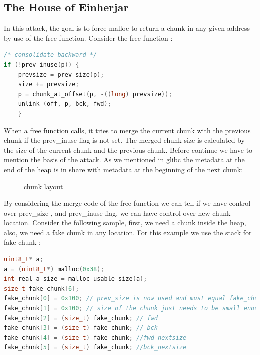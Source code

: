 \documentclass{masterthesis}
\newcommand*\libc{glibc}
\newcommand*\sbs{small bins}
\begin{document}
\subsection{The House of Einherjar}
In this attack, the goal is to force malloc to return a chunk in any given address by use of the free function. Consider the free function :

\begin{lstlisting}[language=c,frame=tlrb]
/* consolidate backward */
if (!prev_inuse(p)) {
    prevsize = prev_size(p);
    size += prevsize;
    p = chunk_at_offset(p, -((long) prevsize));
	unlink (off, p, bck, fwd);
	} 
 \end{lstlisting}
When a free function calls, it tries to merge the current chunk with the previous chunk if the prev\_inuse flag is not set. The merged chunk size is calculated by the size of the current chunk and the previous chunk. Before continue we have to mention the basis of the attack. As we mentioned in \libc{} the metadata at the end of the heap is in share with metadata at the beginning of the next chunk: 

\begin{figure}[h!]
  \caption{chunk layout}
\end{figure}

By considering the merge code of the free function we can tell if we have control over prev\_size , and prev\_inuse flag, we can have control over new chunk location. 
Consider the following sample, first, we need a chunk inside the heap, also, we need a fake chunk in any location. For this example we use the stack for fake chunk :
\begin{lstlisting}[language=c,frame=tlrb]
uint8_t* a;
a = (uint8_t*) malloc(0x38);
int real_a_size = malloc_usable_size(a);
size_t fake_chunk[6];
fake_chunk[0] = 0x100; // prev_size is now used and must equal fake_chunk's size to pass P->bk->size == P->prev_size
fake_chunk[1] = 0x100; // size of the chunk just needs to be small enough to stay in the \sbs{}
fake_chunk[2] = (size_t) fake_chunk; // fwd
fake_chunk[3] = (size_t) fake_chunk; // bck
fake_chunk[4] = (size_t) fake_chunk; //fwd_nextsize
fake_chunk[5] = (size_t) fake_chunk; //bck_nextsize
 \end{lstlisting}
\end{document}
